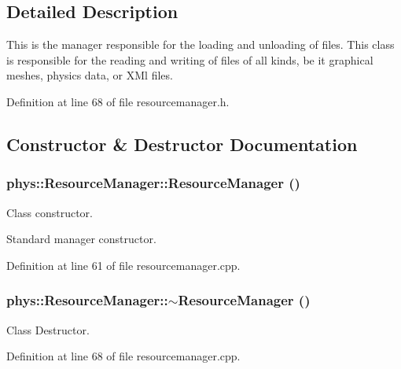 \subsection{Detailed Description}
This is the manager responsible for the loading and unloading of files. This class is responsible for the reading and writing of files of all kinds, be it graphical meshes, physics data, or XMl files. 

Definition at line 68 of file resourcemanager.h.



\subsection{Constructor \& Destructor Documentation}
\hypertarget{classphys_1_1ResourceManager_af114d84fa357432db4184bfd322495b6}{
\subsubsection[{ResourceManager}]{\setlength{\rightskip}{0pt plus 5cm}phys::ResourceManager::ResourceManager ()}}
\label{d1/d35/classphys_1_1ResourceManager_af114d84fa357432db4184bfd322495b6}


Class constructor. 

Standard manager constructor. 

Definition at line 61 of file resourcemanager.cpp.

\hypertarget{classphys_1_1ResourceManager_a426d4d684a9ecf98359362243ce01072}{
\subsubsection[{$\sim$ResourceManager}]{\setlength{\rightskip}{0pt plus 5cm}phys::ResourceManager::$\sim$ResourceManager ()}}
\label{d1/d35/classphys_1_1ResourceManager_a426d4d684a9ecf98359362243ce01072}
Class Destructor. 

Definition at line 68 of file resourcemanager.cpp.



